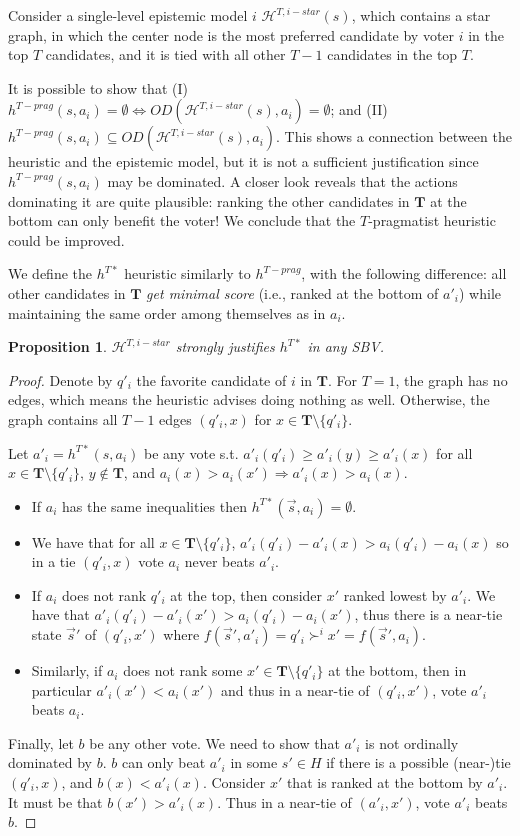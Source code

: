 \documentclass[letterpaper]{article} %
\def\calH{\mathcal{H}}
\newtheorem{proposition}[theorem]{Proposition}
\begin{document}
Consider a single-level epistemic model $i$ $\calH^{T,i-star}(s)$, which contains a star graph, in which the center node is the most preferred candidate by voter $i$ in the top $T$ candidates, and it is tied with all other $T-1$ candidates in the top $T$.

It is possible to show that (I) $h^{T-prag}(s,a_i)=\emptyset \iff OD(\calH^{T,i-star}(s),a_i)=\emptyset$; and (II) $h^{T-prag}(s,a_i) \subseteq OD(\calH^{T,i-star}(s),a_i)$.
This shows a connection between the heuristic and the epistemic model, but it is not a sufficient justification since $h^{T-prag}(s,a_i)$ may be dominated. A closer look reveals that the actions dominating it are quite plausible: ranking the other candidates in $\mathbf  T$ at the bottom can only benefit the voter! We conclude that the $T$-pragmatist heuristic could be improved.

We define the $h^{T*}$ heuristic similarly to $h^{T-prag}$, with the following difference: all other candidates in $\mathbf  T$ \emph{get minimal score} (i.e., ranked at the bottom of $a'_i$) while maintaining the same order among themselves as in $a_i$.
\begin{proposition}
$\calH^{T,i-star}$ strongly justifies $h^{T*}$ in any SBV.
\end{proposition}
\begin{proof}
Denote by $q'_i$ the favorite candidate of $i$ in $\mathbf  T$.
For $T=1$, the graph has no edges, which means the heuristic advises doing nothing as well.
Otherwise, the graph contains all $T-1$ edges $(q'_i,x)$ for $x\in \mathbf  T\setminus \{q'_i\}$.

Let $a'_i=h^{T*}(s,a_i)$ be any vote s.t. $a'_i(q'_i) \geq a'_i(y) \geq a'_i(x)$ for all $x\in \mathbf  T\setminus \{q'_i\}$, $y\notin \mathbf  T$, and $a_i(x)>a_i(x') \Rightarrow a'_i(x)>a_i(x)$.
\begin{itemize}
\item If $a_i$ has the same inequalities then $h^{T*}(\vec s,a_i)=\emptyset$.
\item We have that for all $x \in \mathbf T\setminus \{q'_i\}$, $a'_i(q'_i)-a'_i(x) > a_i(q'_i)-a_i(x)$ so in a tie $(q'_i,x)$ vote $a_i$ never beats $a'_i$.
\item If $a_i$ does not rank $q'_i$ at the top, then consider $x'$ ranked lowest by $a'_i$. We have that $a'_i(q'_i)-a'_i(x') > a_i(q'_i)-a_i(x')$, thus there is  a near-tie state $\vec s'$ of $(q'_i,x')$ where $f(\vec s',a'_i)=q'_i \succ^i x' = f(\vec s',a_i)$.
\item Similarly, if $a_i$ does not rank some $x' \in \mathbf T\setminus \{q'_i\}$ at the bottom,  then in particular $a'_i(x') <a_i(x')$ and thus in a near-tie of $(q'_i,x')$, vote $a'_i$ beats $a_i$.
\end{itemize}
Finally, let $b$ be any other vote. We need to show that $a'_i$ is not ordinally dominated by $b$. $b$ can only beat $a'_i$  in some $s'\in H$ if there is a possible (near-)tie $(q'_i,x)$, and $b(x)<a'_i(x)$. Consider $x'$ that is ranked at the bottom by $a'_i$. It must be that $b(x') > a'_i(x)$. Thus in a near-tie of $(a'_i,x')$, vote $a'_i$ beats $b$.
\end{proof}
\end{document}

